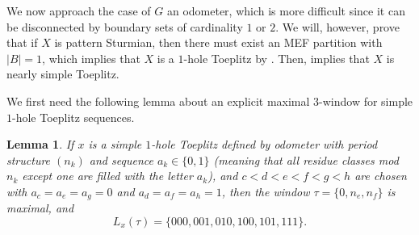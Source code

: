 \documentclass[11pt,reqno]{amsart}
\newtheorem{theorem}{Theorem}[section]
\newtheorem{lemma}[theorem]{Lemma}
\theoremstyle{definition}
\theoremstyle{plain}
\newcommand{\AuthornoteA}[2]{{\sf\small\color{magenta}{[#1: #2]}}}
\newcommand{\AuthornoteR}[2]{{\sf\small\color{blue}{[#1: #2]}}}
\newcommand{\Anote}{\AuthornoteA{A}}
\newcommand{\rp}{\AuthornoteR{R}}
\begin{document}
We now approach the case of $G$ an odometer, which is more difficult since it can be disconnected by boundary sets of cardinality $1$ or $2$. We will, however, prove that if $X$ is pattern Sturmian, then there must exist an MEF partition with $|B| = 1$, which implies that $X$ is a $1$-hole Toeplitz by . Then,  implies that $X$ is nearly simple Toeplitz. %



We first need the following lemma about an explicit maximal $3$-window for simple $1$-hole Toeplitz sequences.


\begin{lemma}\label{1hole3lang}
If $x$ is a simple $1$-hole Toeplitz defined by odometer with period structure $(n_k)$ and sequence $a_k \in \{0,1\}$ 
(meaning that all residue classes mod $n_k$ except one are filled with the letter $a_k$), and 
$c < d < e < f < g < h$ are chosen with $a_c = a_e = a_g = 0$ and $a_d = a_f = a_h = 1$, then the window 
$\tau = \{0, n_e, n_f\}$ is maximal, and 
\[
L_x(\tau) = \{000, 001, 010, 100, 101, 111\}.
\]
\end{lemma}
\end{document}
